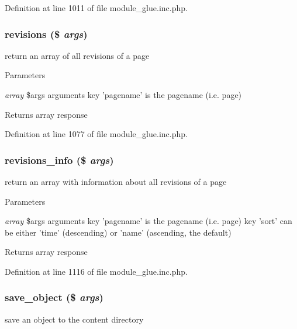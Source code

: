 Definition at line 1011 of file module\_\-glue.inc.php.

\hypertarget{module__glue_8inc_8php_a27d90d2ed1b4142554bc4e0e47e9ba0c}{
\subsubsection[{revisions}]{\setlength{\rightskip}{0pt plus 5cm}revisions (\$ {\em args})}}
\label{module__glue_8inc_8php_a27d90d2ed1b4142554bc4e0e47e9ba0c}
return an array of all revisions of a page


\begin{DoxyParams}{Parameters}
\item[{\em array}]\$args arguments key 'pagename' is the pagename (i.e. page) \end{DoxyParams}
\begin{DoxyReturn}{Returns}
array response 
\end{DoxyReturn}


Definition at line 1077 of file module\_\-glue.inc.php.

\hypertarget{module__glue_8inc_8php_a1dc65b69a920ac4ebc8f7c1df305060b}{
\subsubsection[{revisions\_\-info}]{\setlength{\rightskip}{0pt plus 5cm}revisions\_\-info (\$ {\em args})}}
\label{module__glue_8inc_8php_a1dc65b69a920ac4ebc8f7c1df305060b}
return an array with information about all revisions of a page


\begin{DoxyParams}{Parameters}
\item[{\em array}]\$args arguments key 'pagename' is the pagename (i.e. page) key 'sort' can be either 'time' (descending) or 'name' (ascending, the default) \end{DoxyParams}
\begin{DoxyReturn}{Returns}
array response 
\end{DoxyReturn}


Definition at line 1116 of file module\_\-glue.inc.php.

\hypertarget{module__glue_8inc_8php_ab294f21c7f6fed0932b65167f180c78c}{
\subsubsection[{save\_\-object}]{\setlength{\rightskip}{0pt plus 5cm}save\_\-object (\$ {\em args})}}
\label{module__glue_8inc_8php_ab294f21c7f6fed0932b65167f180c78c}
save an object to the content directory

